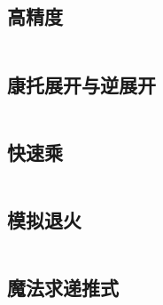 \documentclass[UTF8]{ctexart}
\begin{document}
\subsection{高精度}
\inputminted{cpp}{others/高精度1.cpp}

\subsection{康托展开与逆展开}
\inputminted{cpp}{others/康托展开与康托逆展开.cpp}

\subsection{快速乘}
\inputminted{cpp}{others/快速乘.cpp}

\subsection{模拟退火}
\inputminted{cpp}{others/模拟退火.cpp}

\subsection{魔法求递推式}
\inputminted{cpp}{others/魔法求递推式.cpp}



\end{document}

